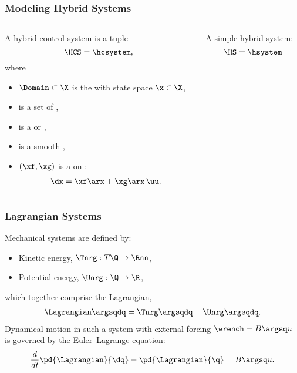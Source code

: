 \begin{frame}[t]
  \frametitle{Modeling Hybrid Systems}
  \begin{columns}
    \begin{column}{.63\textwidth}
      \begin{definition}
        A \alert{hybrid control system} is a tuple \vspace{-.3cm}
        $$\HCS = \hcsystem, \vspace{-.4cm}$$
        where
        \begin{itemize}
        \item
          $\Domain \subset \X$ is the  with state
          space $\x \in \X$,
        \item
          \ControlSet is a set of ,
        \item
          \Guard is a  or ,
        \item
          \ResetMap is a smooth ,
        \item
          $(\xf, \xg)$ is a  on \Domain: \vspace{-3mm}
          \begin{align*}
            \dx = \xf\arx + \xg\arx \, \uu.
          \end{align*}
        \end{itemize}
      \end{definition}
    \end{column}
    \begin{column}{.4\textwidth}
      \begin{figure}    
        \centering
        \def\svgwidth{.8\columnwidth}
        
      \end{figure}
      \vspace{-1em}
      A \alert{simple hybrid system}:\vspace{-.5em}
      $$\HS = \hsystem$$
    \end{column}
  \end{columns}
\end{frame}

\begin{frame}[t]
  \frametitle{Lagrangian Systems}
  Mechanical systems are defined by:
  \begin{itemize}
  \item Kinetic energy, $\Tnrg : T\Q \to \Rnn$,\\
  \item Potential energy, $\Unrg : \Q \to \R$,
  \end{itemize}
  which together comprise the Lagrangian,
  \begin{align*}
    \Lagrangian\argsqdq = \Tnrg\argsqdq - \Unrg\argsqdq.
  \end{align*}
  Dynamical motion in such a system with external forcing $\wrench = B\argsq u$ is governed by the Euler--Lagrange equation:
  \begin{align*}
    \frac{d}{dt} \pd{\Lagrangian}{\dq} - \pd{\Lagrangian}{\q} = B\argsq u.
  \end{align*}
\end{frame}


